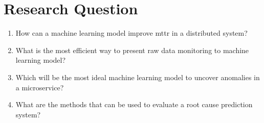 
{\let\clearpage\relax\chapter{Research Question}}


\begin{enumerate}[leftmargin=*,label=\textbf{RQ\arabic*:}]

\item How can a machine learning model improve \ac{mttr} in a distributed system?

\item What is the most efficient way to present raw data monitoring to machine learning model?

\item Which will be the most ideal machine learning model to uncover anomalies in a microservice?

\item What are the methods that can be used to evaluate a root cause prediction system?

\end{enumerate}


